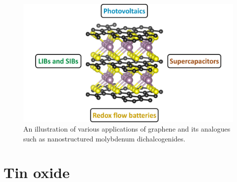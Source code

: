 \begin{figure}[h!]
  \centering
  \includegraphics[width=\textwidth]{Figures/chap6fig/nanoTMDintro.pdf}
    \caption{An illustration of various applications of graphene and its analogues such as nanostructured molybdenum dichalcogenides.}
  \label{Figures/chap6fig:nanoTMDintro}
\end{figure}

\section{Tin oxide}

